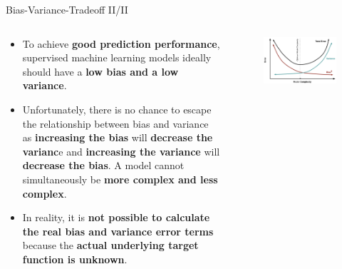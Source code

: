 \documentclass[document.tex]{subfiles}
\begin{document}
    \begin{frame}{Bias-Variance-Tradeoff II/II}
        \begin{columns}
            \begin{column}{0.6\textwidth}
                \begin{itemize}	
                    \item To achieve \textbf{good prediction performance}, supervised machine learning models ideally should have a \textbf{low bias and a low variance}.
                    \item Unfortunately, there is no chance to escape the relationship between bias and variance as \textbf{increasing the bias} will \textbf{decrease the varianc}e and \textbf{increasing the variance} will \textbf{decrease the bias}. A model cannot simultaneously be \textbf{more complex and less complex}.
                    \item In reality, it is \textbf{not possible to calculate the real bias and variance error terms} because the \textbf{actual underlying target function is unknown}.
                \end{itemize}
            \end{column}
            \begin{column}{0.4\textwidth}
                \begin{figure}
                    \label{fig:bias-variance-tradeoff-2}
                    \includegraphics[width=\textwidth, keepaspectratio]{figures/external/bias-variance-tradeoff-2.png}
                \end{figure}
            \end{column}
        \end{columns}
    \end{frame}
        
\end{document}
